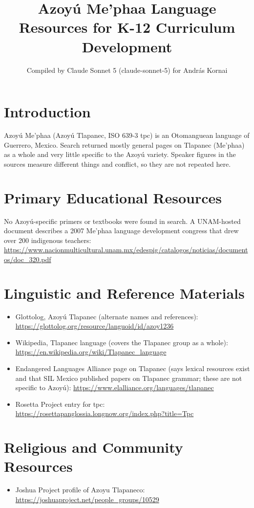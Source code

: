 \documentclass[12pt]{article}
\title{Azoy\'u Me'phaa Language Resources for K-12 Curriculum Development}
\author{Compiled by Claude Sonnet 5 (claude-sonnet-5) for Andr\'as Kornai}
\date{}
\begin{document}
\maketitle

\section{Introduction}
Azoy\'u Me'phaa (Azoy\'u Tlapanec, ISO 639-3 tpc) is an Otomanguean language of Guerrero, Mexico. Search returned mostly general pages on Tlapanec (Me'phaa) as a whole and very little specific to the Azoy\'u variety. Speaker figures in the sources measure different things and conflict, so they are not repeated here.

\section{Primary Educational Resources}
No Azoy\'u-specific primers or textbooks were found in search. A UNAM-hosted document describes a 2007 Me'phaa language development congress that drew over 200 indigenous teachers: \url{https://www.nacionmulticultural.unam.mx/edespig/catalogos/noticias/documentos/doc_320.pdf}

\section{Linguistic and Reference Materials}
\begin{itemize}
\item Glottolog, Azoy\'u Tlapanec (alternate names and references): \url{https://glottolog.org/resource/languoid/id/azoy1236}
\item Wikipedia, Tlapanec language (covers the Tlapanec group as a whole): \url{https://en.wikipedia.org/wiki/Tlapanec_language}
\item Endangered Languages Alliance page on Tlapanec (says lexical resources exist and that SIL Mexico published papers on Tlapanec grammar; these are not specific to Azoy\'u): \url{https://www.elalliance.org/languages/tlapanec}
\item Rosetta Project entry for tpc: \url{https://rosettapanglossia.longnow.org/index.php?title=Tpc}
\end{itemize}

\section{Religious and Community Resources}
\begin{itemize}
\item Joshua Project profile of Azoyu Tlapaneco: \url{https://joshuaproject.net/people_groups/10529}
\end{itemize}
\end{document}
